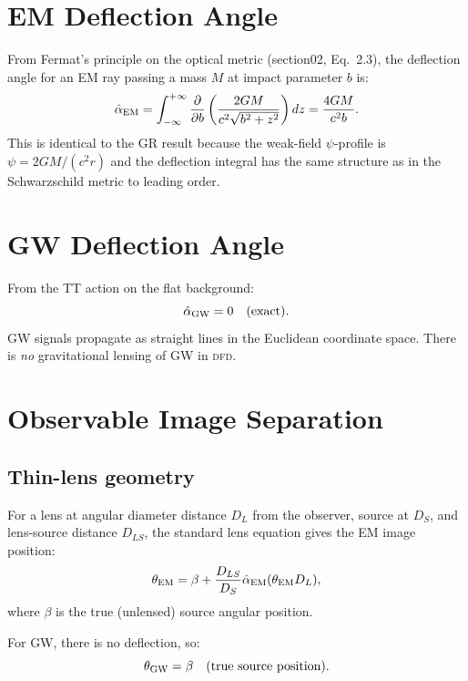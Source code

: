 \documentclass[11pt]{article}
\newcommand{\DFD}{\textsc{dfd}}
\begin{document}
\section{EM Deflection Angle}

From Fermat's principle on the optical metric (section02, Eq.~2.3),
the deflection angle for an EM ray passing a mass $M$ at impact
parameter $b$ is:
\begin{equation}\label{eq:alpha-EM}
\hat{\alpha}_{\rm EM} = \int_{-\infty}^{+\infty}
\frac{\partial}{\partial b}\left(\frac{2GM}{c^2\sqrt{b^2+z^2}}\right)dz
= \frac{4GM}{c^2 b}.
\end{equation}
This is identical to the GR result because the weak-field $\psi$-profile
is $\psi = 2GM/(c^2 r)$ and the deflection integral has the same
structure as in the Schwarzschild metric to leading order.

\section{GW Deflection Angle}

From the TT action on the flat background:
\begin{equation}\label{eq:alpha-GW}
\hat{\alpha}_{\rm GW} = 0 \quad \text{(exact)}.
\end{equation}
GW signals propagate as straight lines in the Euclidean coordinate
space. There is \emph{no} gravitational lensing of GW in \DFD.

\section{Observable Image Separation}

\subsection{Thin-lens geometry}

For a lens at angular diameter distance $D_L$ from the observer,
source at $D_S$, and lens-source distance $D_{LS}$, the standard
lens equation gives the EM image position:
\begin{equation}
\theta_{\rm EM} = \beta + \frac{D_{LS}}{D_S}\hat{\alpha}_{\rm EM}
(\theta_{\rm EM} D_L),
\end{equation}
where $\beta$ is the true (unlensed) source angular position.

For GW, there is no deflection, so:
\begin{equation}
\theta_{\rm GW} = \beta \quad \text{(true source position)}.
\end{equation}
\end{document}
